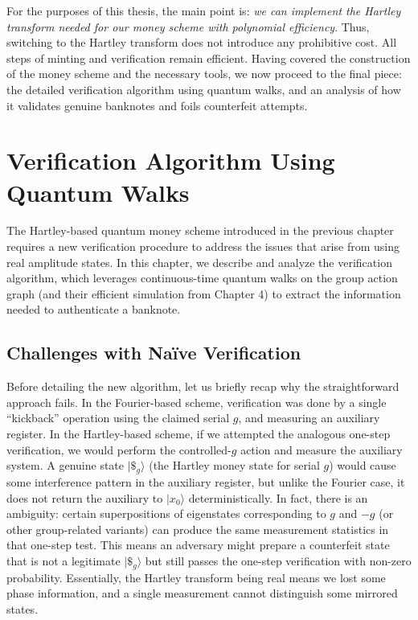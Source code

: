 \documentclass[11pt]{article}
\theoremstyle{definition}
\begin{document}
For the purposes of this thesis, the main point is: \emph{we can implement the Hartley transform needed for our money scheme with polynomial efficiency}. Thus, switching to the Hartley transform does not introduce any prohibitive cost. All steps of minting and verification remain efficient. Having covered the construction of the money scheme and the necessary tools, we now proceed to the final piece: the detailed verification algorithm using quantum walks, and an analysis of how it validates genuine banknotes and foils counterfeit attempts.
\vspace{1em}



\chapter{Verification Algorithm Using Quantum Walks}
The Hartley-based quantum money scheme introduced in the previous chapter requires a new verification procedure to address the issues that arise from using real amplitude states. In this chapter, we describe and analyze the verification algorithm, which leverages continuous-time quantum walks on the group action graph (and their efficient simulation from Chapter 4) to extract the information needed to authenticate a banknote.

    \section{Challenges with Naïve Verification}
    Before detailing the new algorithm, let us briefly recap why the straightforward approach fails. In the Fourier-based scheme, verification was done by a single “kickback” operation using the claimed serial $g$, and measuring an auxiliary register. In the Hartley-based scheme, if we attempted the analogous one-step verification, we would perform the controlled-$g$ action and measure the auxiliary system. A genuine state $|\$_g\rangle$ (the Hartley money state for serial $g$) would cause some interference pattern in the auxiliary register, but unlike the Fourier case, it does not return the auxiliary to $|x_0\rangle$ deterministically. In fact, there is an ambiguity: certain superpositions of eigenstates corresponding to $g$ and $-g$ (or other group-related variants) can produce the same measurement statistics in that one-step test. This means an adversary might prepare a counterfeit state that is not a legitimate $|\$_g\rangle$ but still passes the one-step verification with non-zero probability. Essentially, the Hartley transform being real means we lost some phase information, and a single measurement cannot distinguish some mirrored states.
\end{document}
